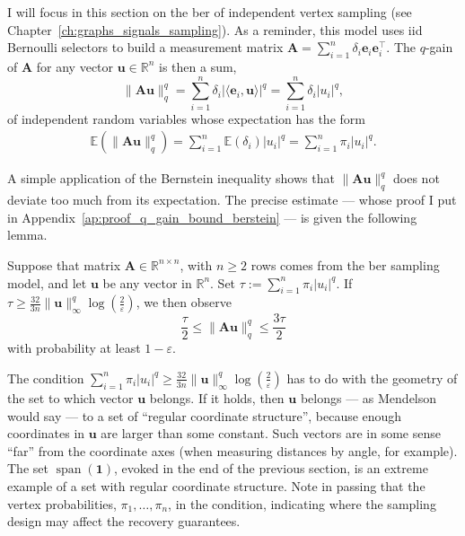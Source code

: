 I will focus in this section on the \acrfull{ber} of independent vertex sampling (see Chapter~\ref{ch:graphs_signals_sampling}). As a reminder, this model uses \acrshort{iid} Bernoulli selectors to build a measurement matrix $\mathbf{A} = \sum_{i=1}^{n} \delta_i \mathbf{e}_i \mathbf{e}_i^\top$. The $q$-gain of $\mathbf{A}$ for any vector $\mathbf{u} \in \mathbb{R}^{n}$ is then a sum,
\begin{equation}
    \|\mathbf{Au}\|_q^q = \sum_{i=1}^{n} \delta_i |\langle \mathbf{e}_i, \mathbf{u} \rangle |^q = \sum_{i=1}^{n} \delta_i |u_i|^q,
\end{equation}
of independent random variables whose expectation has the form
\begin{align}
    \mathbb{E} \left ( \|\mathbf{Au}\|_q^q \right ) = \sum_{i=1}^{n} \mathbb{E} \left ( \delta_i \right ) |u_i|^q = \sum_{i=1}^{n} \pi_i |u_i|^q.
\end{align}

A simple application of the Bernstein inequality shows that $\|\mathbf{Au}\|_q^q$ does not deviate too much from its expectation. The precise estimate --- whose proof I put in Appendix~\ref{ap:proof_q_gain_bound_berstein} --- is given the following lemma.

\clearpage

\begin{lemma}\label{lem:q_gain_bound_berstein}
    Suppose that matrix $\mathbf{A} \in \mathbb{R}^{n \times n}$, with $n \geq 2$ rows comes from the \acrshort{ber} sampling model, and let $\mathbf{u}$ be any vector in $\mathbb{R}^{n}$. Set $\tau := \sum_{i=1}^{n} \pi_i |u_i|^q$. If $\tau \geq \frac{32}{3n} \|\mathbf{u}\|_{\infty}^q \log \left ( \frac{2}{\varepsilon} \right )$, we then observe
    \begin{equation}
        \frac{\tau}{2} \leq \|\mathbf{Au}\|_q^q \leq \frac{3\tau}{2}
    \end{equation}
    with probability at least $1 - \varepsilon$.
\end{lemma}

The condition $\sum_{i=1}^{n} \pi_i |u_i|^q \geq \frac{32}{3n} \|\mathbf{u}\|_{\infty}^q \log \left ( \frac{2}{\varepsilon} \right )$ has to do with the geometry of the set to which vector $\mathbf{u}$ belongs. If it holds, then $\mathbf{u}$ belongs --- as Mendelson~\cite{mendelson2018a} would say --- to a set of ``regular coordinate structure'', because enough coordinates in $\mathbf{u}$ are larger than some constant. Such vectors are in some sense ``far'' from the coordinate axes (when measuring distances by angle, for example). The set $\operatorname{span} \left ( \mathbf{1} \right )$, evoked in the end of the previous section, is an extreme example of a set with regular coordinate structure. Note in passing that the vertex probabilities, $\pi_1, \dots, \pi_n$, in the condition, indicating where the sampling design may affect the recovery guarantees.

